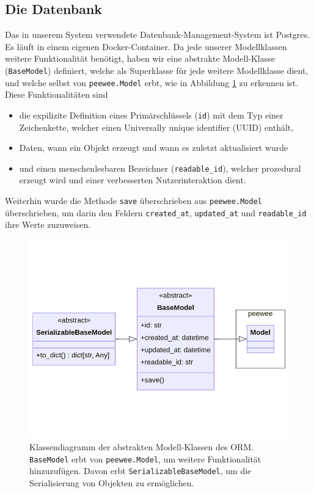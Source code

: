 \subsection{Die Datenbank}

Das in unserem System verwendete Datenbank-Management-System ist Postgres. Es läuft in einem eigenen Docker-Container. Da jede unserer Modellklassen weitere Funktionalität benötigt, haben wir eine abstrakte Modell-Klasse (\texttt{BaseModel}) definiert, welche als Superklasse für jede weitere Modellklasse dient, und welche selbst von \texttt{peewee.Model} erbt, wie in Abbildung \ref{fig:database-class} zu erkennen ist. Diese Funktionalitäten sind 
\begin{itemize}
	\item die expilizite Definition eines Primärschlüssels (\texttt{id}) mit dem Typ einer Zeichenkette, welcher einen Universally unique identifier (UUID) enthält,
	\item Daten, wann ein Objekt erzeugt und wann es zuletzt aktualisiert wurde
	\item und einen menschenlesbaren Bezeichner (\texttt{readable\_id}), welcher prozedural erzeugt wird und einer verbesserten Nutzerinteraktion dient.
\end{itemize}
Weiterhin wurde die Methode \texttt{save} überschrieben aus \texttt{peewee.Model} überschrieben, um darin den Feldern \texttt{created\_at}, \texttt{updated\_at} und \texttt{readable\_id} ihre Werte zuzuweisen.

\begin{figure}[!hb]
	\centering
	\includegraphics[width=0.75\linewidth]{images/diagrams/database-class.png}
	\caption{Klassendiagramm der abstrakten Modell-Klassen des ORM. \texttt{BaseModel} erbt von \texttt{peewee.Model}, um weitere Funktionalität hinzuzufügen. Davon erbt \texttt{SerializableBaseModel}, um die Serialisierung von Objekten zu ermöglichen.}
	\label{fig:database-class}
\end{figure}

